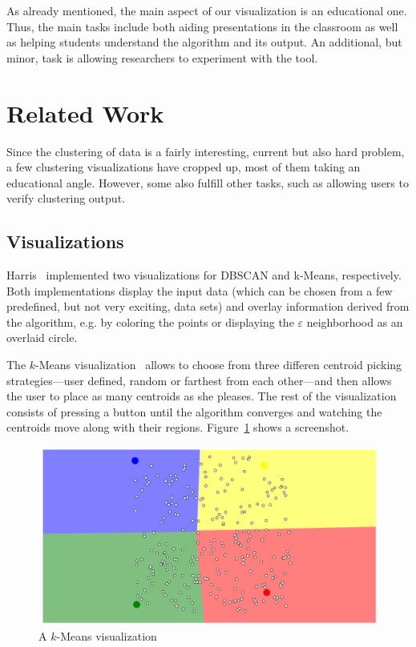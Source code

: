 \documentclass{vgtc} %
\begin{document}
As already mentioned, the main aspect of our visualization is an educational one.
Thus, the main tasks include both aiding presentations in the classroom as well as
helping students understand the algorithm and its output. An additional, but minor,
task is allowing researchers to experiment with the tool.

\section{Related Work} %

Since the clustering of data is a fairly interesting, current but also hard
problem, a few clustering visualizations have cropped up, most of them taking
an educational angle. However, some also fulfill other tasks, such as allowing
users to verify clustering output.

\subsection{Visualizations}

Harris~\cite{dbscan,kmeans} implemented two visualizations for DBSCAN and
k-Means, respectively. Both implementations display the input data (which can
be chosen from a few predefined, but not very exciting, data sets) and overlay
information derived from the algorithm, e.g. by coloring the points or
displaying the $\varepsilon$ neighborhood as an overlaid circle.

The $k$-Means visualization~\cite{kmeans} allows to choose from three differen centroid picking
strategies---user defined, random or farthest from each other---and then allows the
user to place as many centroids as she pleases. The rest of the visualization consists
of pressing a button until the algorithm converges and watching the centroids move
along with their regions. Figure~\ref{fig:kmeans} shows a screenshot.

\begin{figure}[tb]
    \centering
    \includegraphics[width=\columnwidth]{kmeans}
    \caption{A $k$-Means visualization}
    \label{fig:kmeans}
\end{figure}
\end{document}
